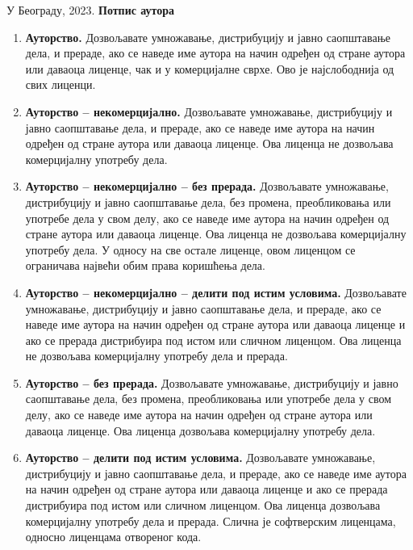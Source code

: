 \vfill

 
У Београду, \hspace{1cm} 2023.  \hfill  \textbf{Потпис
аутора\hspace{2cm}\mbox{}}

\vspace{.5cm}
\hspace{10cm}\hrulefill 

\hspace{\fill}

\pagebreak
\thispagestyle{empty}


\begin{enumerate}[leftmargin=0.5cm]
\item \textbf{Ауторство.} Дозвољавате умножавање, дистрибуцију и јавно 
саопштавање дела, и 
прераде, ако се наведе име аутора на начин одређен од стране аутора или даваоца 
лиценце, чак и у комерцијалне сврхе. Ово је најслободнија од свих лиценци.
\item \textbf{Ауторство -- некомерцијално.} Дозвољавате умножавање, 
дистрибуцију и јавно 
саопштавање дела, и прераде, ако се наведе име аутора на начин одређен од 
стране 
аутора или даваоца лиценце. Ова лиценца не дозвољава комерцијалну употребу дела.
\item \textbf{Ауторство -- некомерцијално -- без прерада.} Дозвољавате 
умножавање, 
дистрибуцију и јавно саопштавање дела, без промена, преобликовања или употребе 
дела у свом делу, ако се наведе име аутора на начин одређен од стране аутора 
или 
даваоца лиценце. Ова лиценца не дозвољава комерцијалну употребу дела. У односу 
на све остале лиценце, овом лиценцом се ограничава највећи обим права коришћења 
дела. 
\item \textbf{Ауторство -- некомерцијално -- делити под истим условима.} 
Дозвољавате умножавање, дистрибуцију и јавно саопштавање дела, и прераде, ако се 
наведе име 
аутора на начин одређен од стране аутора или даваоца лиценце и ако се прерада 
дистрибуира под истом или сличном лиценцом. Ова лиценца не дозвољава 
комерцијалну употребу дела и прерада.
\item \textbf{Ауторство -- без прерада.} Дозвољавате умножавање, дистрибуцију и 
јавно 
саопштавање дела, без промена, преобликовања или употребе дела у свом делу, ако 
се наведе име аутора на начин одређен од стране аутора или даваоца лиценце. Ова 
лиценца дозвољава комерцијалну употребу дела.
\item \textbf{Ауторство -- делити под истим условима.} Дозвољавате умножавање, 
дистрибуцију и 
јавно саопштавање дела, и прераде, ако се наведе име аутора на начин одређен од 
стране аутора или даваоца лиценце и ако се прерада дистрибуира под истом или 
сличном лиценцом. Ова лиценца дозвољава комерцијалну употребу дела и прерада. 
Слична је софтверским лиценцама, односно лиценцама отвореног кода.               
\end{enumerate}
